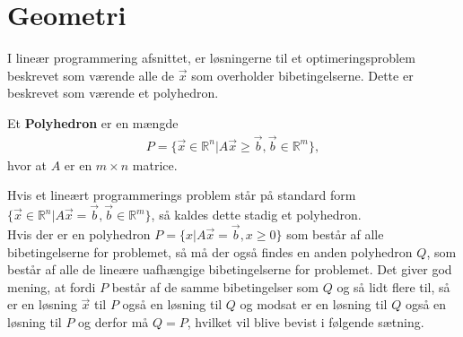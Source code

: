 \chapter{Geometri}
I lineær programmering afsnittet, er løsningerne til et optimeringsproblem beskrevet som værende alle de $\vec{x}$ som overholder bibetingelserne. Dette er beskrevet som værende et polyhedron.
\begin{defn} [Polyhedron]
Et \textbf{Polyhedron} er en mængde 
\begin{align*}
 P =\{ \vec{x} \in \mathds{R}^n | A \vec{x} \geq \vec{b}, \vec{b}\in \mathds{R}^m\},
\end{align*}
hvor at $A$ er en $m \times n$ matrice.
\end{defn}
Hvis et lineært programmerings problem står på standard form $\{ \vec{x} \in \mathds{R}^n | A \vec{x} = \vec{b}, \vec{b}\in \mathds{R}^m\}$, så kaldes dette stadig et polyhedron.\\

Hvis der er en polyhedron $P=\{x|A\vec{x}=\vec{b},x\geq 0\}$ som består af alle bibetingelserne for problemet, så må der også findes en anden polyhedron $Q$, som består af alle de lineære uafhængige bibetingelserne for problemet. Det giver god mening, at fordi $P$ består af de samme bibetingelser som $Q$ og så lidt flere til, så er en løsning $\vec{x}$ til $P$ også en løsning til $Q$ og modsat er en løsning til $Q$ også en løsning til $P$ og derfor må $Q=P$, hvilket vil blive bevist i følgende sætning.

